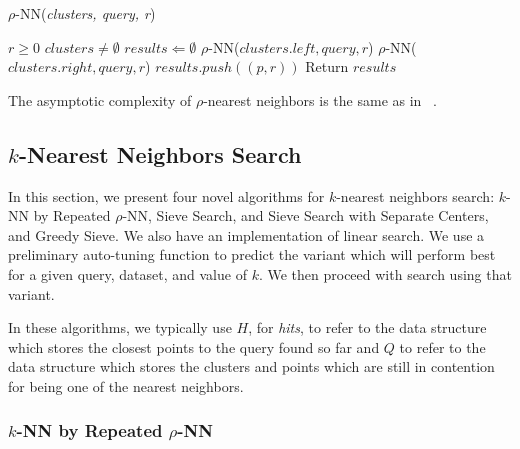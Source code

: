 \begin{algorithm} 
    \caption{$\rho$-NN(\emph{clusters, query, r})} 
    \label{alg:rnn} 
    \begin{algorithmic}[2]
        \REQUIRE $r \geq 0$
        \REQUIRE $clusters \neq \emptyset$
        \STATE $results \Leftarrow \emptyset$
                \STATE $\rho$-NN($clusters.left, query, r$)
            \ENDIF
        \ENDIF
                \STATE $\rho$-NN($clusters.right, query, r$)
            \ENDIF
        \ENDIF
                    \STATE $results.push((p, r))$
                \ENDIF
            \ENDFOR
        \ENDIF
        \STATE Return $results$
    \end{algorithmic}
    \end{algorithm}


The asymptotic complexity of $\rho$-nearest neighbors is the same as in ~\cite{ishaq2019clustered}.

\subsection{\texorpdfstring{$k$}{k}-Nearest Neighbors Search}
\label{subsec:methods:knn-search}

In this section, we present four novel algorithms for $k$-nearest neighbors search: $k$-NN by Repeated $\rho$-NN, Sieve Search, and Sieve Search with Separate Centers, 
and  Greedy Sieve. 
We also have an implementation of linear search. We use a preliminary auto-tuning function to predict the variant which will perform 
best for a given query, dataset, and value of $k$. We then proceed with search using that variant.  

In these algorithms, we typically use $H$, for \emph{hits}, to refer to the data structure which stores the closest points to the query found so far and
$Q$ to refer to the data structure which stores the clusters and points which are still in contention for being one of the nearest neighbors.


\subsubsection{$k$-NN by Repeated $\rho$-NN}
\label{subsubsec:methods:knn-search:repeated-rnn}


